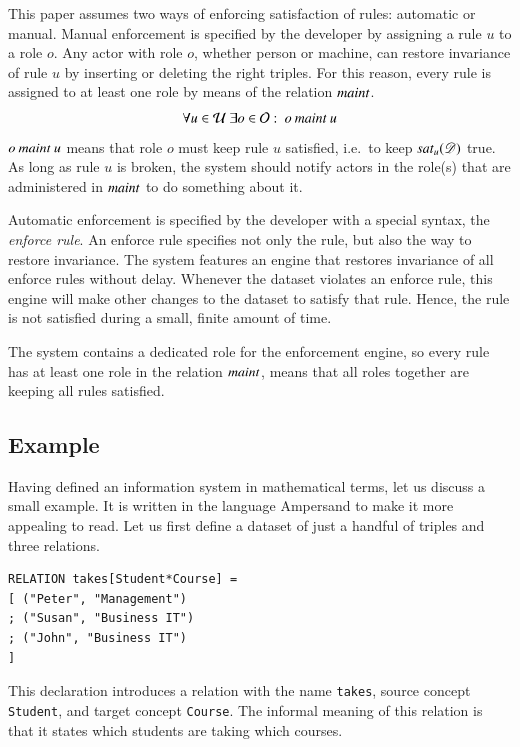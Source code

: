 \documentclass{elsarticle}
\begin{document}
   This paper assumes two ways of enforcing satisfaction of rules: automatic or manual.
   Manual enforcement is specified by the developer by assigning a rule $u$ to a role $o$.
   Any actor with role $o$, whether person or machine,
   can restore invariance of rule $u$ by inserting or deleting the right triples.
   For this reason, every rule is assigned to at least one role by means of the relation $\mathbin{\text{\it maint\/}}$.
\begin{equation}
   \forall u\in\rules\ \exists o\in\roles:\ o\maintain u\label{eqn:maintain}
\end{equation}
   $o\mathbin{\text{\it maint\/}} u$ means that role $o$ must keep rule $u$ satisfied, i.e.\ to keep $\text{\it sat\/}_{u}(\mathscr{D})$ true.
   As long as rule $u$ is broken, the system should notify actors in the role(s) that are administered in $\mathbin{\text{\it maint\/}}$ to do something about it.

   Automatic enforcement is specified by the developer with a special syntax,
   the {\em enforce rule}.
   An enforce rule specifies not only the rule, but also the way to restore invariance.
   The system features an engine that restores invariance of all enforce rules without delay.
   Whenever the dataset violates an enforce rule,
   this engine will make other changes to the dataset to satisfy that rule.
   Hence, the rule is not satisfied during a small, finite amount of time.

   The system contains a dedicated role for the enforcement engine,
   so every rule has at least one role in the relation $\mathbin{\text{\it maint\/}}$, means that all roles together are keeping all rules satisfied.

\subsection{Example}
\label{sct:Example existing IS}
   Having defined an information system in mathematical terms, let us discuss a small example.
   It is written in the language Ampersand to make it more appealing to read.
   Let us first define a dataset of just a handful of triples and three relations.
\begin{verbatim}
RELATION takes[Student*Course] =
[ ("Peter", "Management")
; ("Susan", "Business IT")
; ("John", "Business IT")
]
\end{verbatim}
   This declaration introduces a relation with the name \verb#takes#,
   source concept \verb#Student#, and
   target concept \verb#Course#.
   The informal meaning of this relation is that it states which students are taking which courses.
\end{document}
